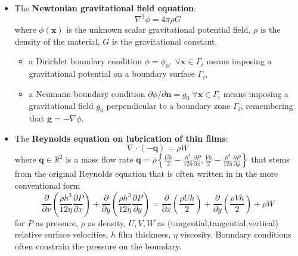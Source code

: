 \documentclass{digitaldynamics}
\def\vect#1{\bm{#1}}
\begin{document}
\begin{itemize}
	
	
	\item The \textbf{Newtonian gravitational field equation}:
	\[
	\nabla^2 \phi = 4 \pi \rho G
	\]
	where $\phi(\vect{x})$ is the unknown scalar gravitational potential field, 
	$\rho$ is the density of the material,
	$G$ is the gravitational constant. 
	\begin{itemize}
		\item a Dirichlet boundary condition $\phi=\phi_0, \; \forall \vect{x}\in\Gamma_i$ means imposing a gravitational potential on a boundary surface $\Gamma_i$, 
		\item a Neumann   boundary condition $\partial{\phi}/\partial{\vect{n}}=g_0 \; \forall \vect{x}\in\Gamma_i$ means imposing a gravitational field $g_0$ perpendicular to a boundary zone $\Gamma_i$, remembering that $\vect{g}= -\nabla \phi$.
	\end{itemize}
	
	
	\item The \textbf{Reynolds equation on lubrication of thin films}:
	\[
	\nabla \cdot (-\vect{q}) =  \rho W
	\]
	where $\vect{q} \in \mathbb{R}^2$ is a mass flow rate 
	$\vect{q}=\rho \left\{ 
	\frac{Uh}{2}-\frac{h^3}{12\eta}\frac{\partial P}{\partial x},
	\frac{Vh}{2}-\frac{h^3}{12\eta}\frac{\partial P}{\partial y}
	\right\}$ 
	that stems from the original Reynolds equation that is often written in  in the more conventional form 
	\[
	 \frac{\partial}{\partial x} \left( \frac{\rho h^3}{12 \eta}\frac{\partial P}{\partial x}\right) 
  +\frac{\partial}{\partial y} \left( \frac{\rho h^3}{12 \eta}\frac{\partial P}{\partial y}\right) 
	= \frac{\partial}{\partial x}\left( \frac{\rho U h}{2}\right)
	+ \frac{\partial}{\partial y}\left( \frac{\rho V h}{2}\right)
	+ \rho W
	\] 
	for $P$ as pressure, $\rho$ as density, $U,V,W$ as (tangential,tangential,vertical) relative surface velocities, $h$ film thickness, $\eta$ viscosity. Boundary conditions often constrain the pressure on the boundary.
	


\end{itemize}
\end{document}

